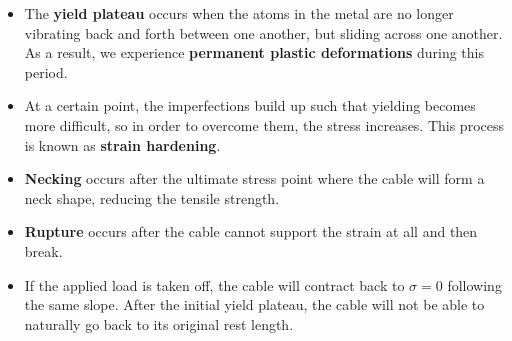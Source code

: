 \begin{itemize}
\begin{center}
    \end{center}
    \item The \textbf{yield plateau} occurs when the atoms in the metal are no longer vibrating back and forth between one another, but sliding across one another. As a result, we experience \textbf{permanent plastic deformations} during this period.
    \item At a certain point, the imperfections build up such that yielding becomes more difficult, so in order to overcome them, the stress increases. This process is known as \textbf{strain hardening}.
    \item \textbf{Necking} occurs after the ultimate stress point where the cable will form a neck shape, reducing the tensile strength.
    \item \textbf{Rupture} occurs after the cable cannot support the strain at all and then break.
    \item If the applied load is taken off, the cable will contract back to $\sigma=0$ following the same slope. After the initial yield plateau, the cable will not be able to naturally go back to its original rest length.
\end{itemize}